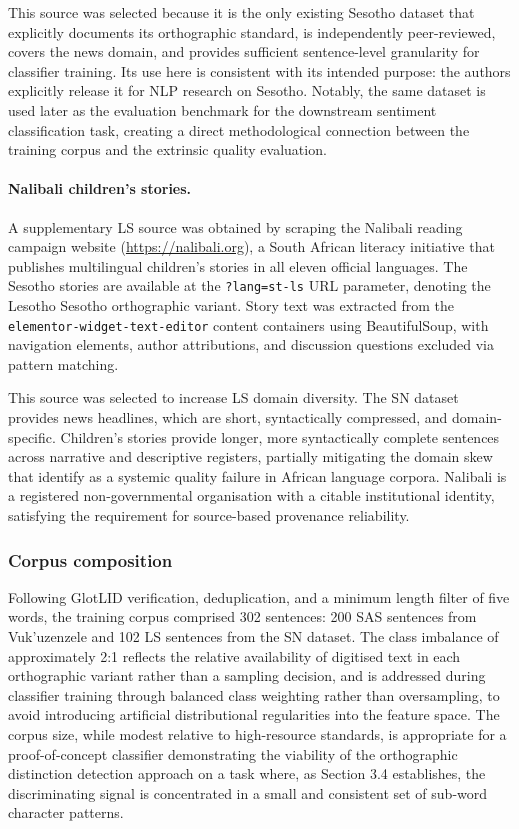 \documentclass[11pt,a4paper]{article}
\begin{document}
This source was selected because it is the only existing Sesotho dataset that
explicitly documents its orthographic standard, is independently peer-reviewed,
covers the news domain, and provides sufficient sentence-level granularity for
classifier training. Its use here is consistent with its intended purpose: the
authors explicitly release it for NLP research on Sesotho. Notably, the same
dataset is used later as the evaluation benchmark for the downstream sentiment
classification task, creating a direct methodological connection between the
training corpus and the extrinsic quality evaluation.

\paragraph{Nalibali children's stories.}
A supplementary LS source was obtained by scraping the Nalibali reading
campaign website (\url{https://nalibali.org}), a South African literacy
initiative that publishes multilingual children's stories in all eleven official
languages. The Sesotho stories are available at the \texttt{?lang=st-ls} URL
parameter, denoting the Lesotho Sesotho orthographic variant. Story text was
extracted from the \texttt{elementor-widget-text-editor} content containers
using BeautifulSoup, with navigation elements, author attributions, and
discussion questions excluded via pattern matching.

This source was selected to increase LS domain diversity. The SN dataset
provides news headlines, which are short, syntactically compressed, and
domain-specific. Children's stories provide longer, more syntactically complete
sentences across narrative and descriptive registers, partially mitigating the
domain skew that \citet{kwon2026afroscope} identify as a systemic quality
failure in African language corpora. Nalibali is a registered non-governmental
organisation with a citable institutional identity, satisfying the requirement
for source-based provenance reliability.

\subsubsection{Corpus composition}

Following GlotLID verification, deduplication, and a minimum length filter of
five words, the training corpus comprised 302 sentences: 200 SAS sentences
from Vuk'uzenzele and 102 LS sentences from the SN dataset. The class
imbalance of approximately 2:1 reflects the relative availability of
digitised text in each orthographic variant rather than a sampling decision,
and is addressed during classifier training through balanced class weighting
rather than oversampling, to avoid introducing artificial distributional
regularities into the feature space. The corpus size, while modest relative
to high-resource standards, is appropriate for a proof-of-concept classifier
demonstrating the viability of the orthographic distinction detection approach
on a task where, as Section 3.4 establishes, the discriminating signal is
concentrated in a small and consistent set of sub-word character patterns. 
\end{document}
